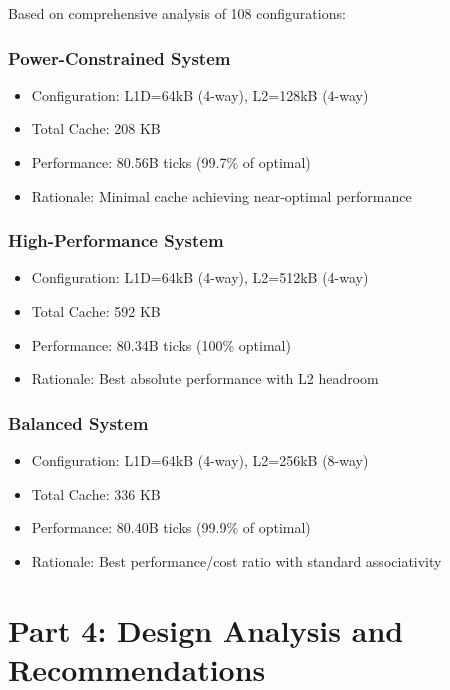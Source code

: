 \documentclass[11pt,a4paper]{article}
\begin{document}
Based on comprehensive analysis of 108 configurations:

\subsubsection{Power-Constrained System}
\begin{itemize}[noitemsep]
    \item Configuration: L1D=64kB (4-way), L2=128kB (4-way)
    \item Total Cache: 208 KB
    \item Performance: 80.56B ticks (99.7\% of optimal)
    \item Rationale: Minimal cache achieving near-optimal performance
\end{itemize}

\subsubsection{High-Performance System}
\begin{itemize}[noitemsep]
    \item Configuration: L1D=64kB (4-way), L2=512kB (4-way)
    \item Total Cache: 592 KB
    \item Performance: 80.34B ticks (100\% optimal)
    \item Rationale: Best absolute performance with L2 headroom
\end{itemize}

\subsubsection{Balanced System}
\begin{itemize}[noitemsep]
    \item Configuration: L1D=64kB (4-way), L2=256kB (8-way)
    \item Total Cache: 336 KB
    \item Performance: 80.40B ticks (99.9\% of optimal)
    \item Rationale: Best performance/cost ratio with standard associativity
\end{itemize}

\newpage


\section{Part 4: Design Analysis and Recommendations}
\end{document}
